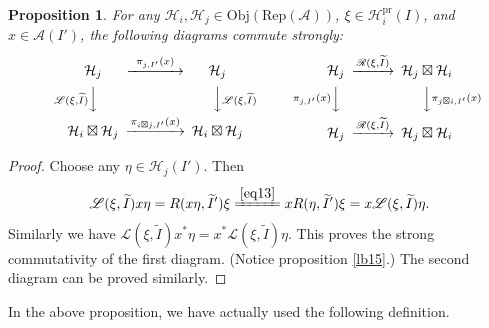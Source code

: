 \documentclass[12pt,a4paper]{article}
\theoremstyle{definition}
\theoremstyle{plain}
\newtheorem{pp}[df]{Proposition}
\newcommand{\mc}{\mathcal}
\newcommand{\wtd}{\widetilde}
\newcommand{\scr}{\mathscr}
\newcommand{\RepA}{\mathrm{Rep}(\mc A)}
\newcommand{\Obj}{\mathrm{Obj}}
\newcommand{\pr}{\mathrm{pr}}
\numberwithin{equation}{subsection}
\begin{document}
\begin{pp}\label{lb18}
	For any $\mc H_i,\mc H_j\in\Obj(\RepA)$, $\xi\in\mc H_i^\pr(I)$, and $x\in\mc A(I')$, the following diagrams commute strongly:
	\begin{gather}
	\begin{CD}
	\mc H_j @>~\pi_{j,I'}(x)~>> \mc H_j\\
	@V \scr L(\xi,\wtd I)  VV @VV \scr L(\xi,\wtd I) V\\
	\mc H_i\boxtimes\mc H_j @> \pi_{i\boxtimes j,I'}(x)>> \mc H_i\boxtimes\mc H_j
	\end{CD}\qquad\qquad\qquad
	\begin{CD}
	\mc H_j @> \scr R(\xi,\wtd I)  >> \mc H_j\boxtimes\mc H_i\\
	@V \pi_{j,I'}(x) VV @VV \pi_{j\boxtimes i,I'}(x) V\\
	\mc H_j @>\scr R(\xi,\wtd I) >> \mc H_j\boxtimes\mc H_i
	\end{CD}
	\end{gather}
\end{pp}

\begin{proof}
	Choose any $\eta\in\mc H_j(I')$. Then
	\begin{align*}
	\scr L(\xi,\wtd I)x\eta=R(x\eta,\wtd I')\xi \xlongequal{\eqref{eq13}} xR(\eta,\wtd I')\xi=x\scr L(\xi,\wtd I)\eta.
	\end{align*}
	Similarly we have $\scr L(\xi,\wtd I)x^*\eta=x^*\scr L(\xi,\wtd I)\eta$. This proves the strong commutativity of the first diagram. (Notice proposition \ref{lb15}.) The second diagram can be proved similarly.
\end{proof}


In the above proposition, we have actually used the following definition.
\end{document}

